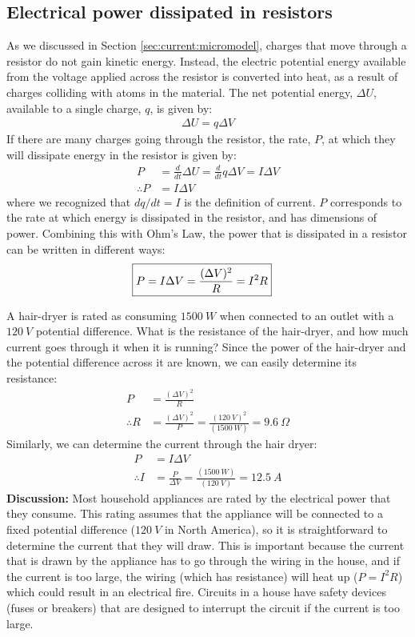 \subsection{Electrical power dissipated in resistors}
As we discussed in Section \ref{sec:current:micromodel}, charges that move through a resistor do not gain kinetic energy. Instead, the electric potential energy available from the voltage applied across the resistor is converted into heat, as a result of charges colliding with atoms in the material. The net potential energy, $\Delta U$, available to a single charge, $q$, is given by:
\begin{align*}
\Delta U=q\Delta V
\end{align*}
If there are many charges going through the resistor, the rate, $P$, at which they will dissipate energy in the resistor is given by:
\begin{align*}
P&=\frac{d}{dt}\Delta U=\frac{d}{dt}q\Delta V=I\Delta V\\
\therefore P&=I\Delta V
\end{align*}
where we recognized that $dq/dt=I$ is the definition of current. $P$ corresponds to the rate at which energy is dissipated in the resistor, and has dimensions of power. Combining this with Ohm's Law, the power that is dissipated in a resistor can be written in different ways:
\begin{align*}
\Aboxed{P=I \Delta V=\frac{(\Delta V)^2}{R}=I^2R}
\end{align*}
\begin{example}{A hair-dryer is rated as consuming $\SI{1500}{W}$ when connected to an outlet with a $\SI{120}{V}$ potential difference. What is the resistance of the hair-dryer, and how much current goes through it when it is running?}
Since the power of the hair-dryer and the potential difference across it are known, we can easily determine its resistance:
\begin{align*}
P&=\frac{(\Delta V)^2}{R}\\
\therefore R&=\frac{(\Delta V)^2}{P}=\frac{(\SI{120}{V})^2}{(\SI{1500}{W})}=\SI{9.6}{\Omega}
\end{align*}
Similarly, we can determine the current through the hair dryer:
\begin{align*}
P&=I\Delta V\\
\therefore I &=\frac{P}{\Delta V}=\frac{(\SI{1500}{W})}{(\SI{120}{V})}=\SI{12.5}{A}
\end{align*}
\textbf{Discussion: }Most household appliances are rated by the electrical power that they consume. This rating assumes that the appliance will be connected to a fixed potential difference ($\SI{120}{V}$ in North America), so it is  straightforward to determine the current that they will draw. This is important because the current that is drawn by the appliance has to go through the wiring in the house, and if the current is too large, the wiring (which has resistance) will heat up ($P=I^2R$) which could result in an electrical fire. Circuits in a house have safety devices (fuses or breakers) that are designed to interrupt the circuit if the current is too large.
\end{example}

